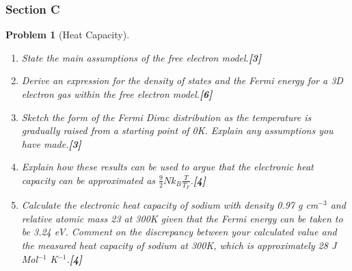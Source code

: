 \documentclass[a4paper]{article}
\theoremstyle{new}
\newtheorem{qns}{Problem}[subsection]
\begin{document}
\subsubsection{Section C}
\begin{qns}[Heat Capacity]\leavevmode
\begin{enumerate}[label=(\alph*)]
\item  State the main assumptions of the free electron model.\hfill\textbf{[3]}
\item Derive an expression for the density of states and the Fermi energy for a 3D electron gas within the free electron model.\hfill\textbf{[6]}
\item Sketch the form of the Fermi Dirac distribution as the temperature is gradually raised from a starting point of 0K. Explain any assumptions you have made.\hfill\textbf{[3]}
\item Explain how these results can be used to argue that the electronic heat capacity can be approximated as $\frac{9}{2}Nk_B\frac{T}{T_F}$.\hfill\textbf{[4]}
\item Calculate the electronic heat capacity of sodium with density 0.97 g cm$^{-3}$ and relative atomic mass 23 at 300K given that the Fermi energy can be taken to be 3.24 eV. Comment on the discrepancy between your calculated value and the measured heat capacity of sodium at 300K, which is approximately 28 J Mol$^{-1}$ K$^{-1}$.\hfill\textbf{[4]}
\end{enumerate}
\end{qns}
\end{document}
